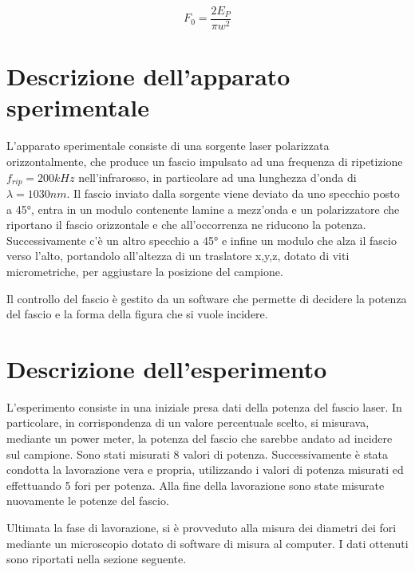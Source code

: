 \documentclass{article}
\begin{document}
\begin{equation}
    F_0 = \frac{2E_P}{\pi w^2}
    \label{fomula fluenza di picco}
\end{equation}



\section{Descrizione dell'apparato sperimentale}
L'apparato sperimentale consiste di una sorgente laser polarizzata orizzontalmente, che produce un fascio impulsato ad una frequenza di ripetizione $f_{rip} = 200 kHz$ nell'infrarosso, in particolare ad una lunghezza d'onda di $\lambda = 1030 nm$.
Il fascio inviato dalla sorgente viene deviato da uno specchio posto a 45°, entra in un modulo contenente lamine a mezz'onda e un polarizzatore che riportano il fascio orizzontale e che all'occorrenza ne riducono la potenza.
Successivamente c'è un altro specchio a 45° e infine un modulo che alza il fascio verso l'alto, portandolo all'altezza di un traslatore x,y,z, dotato di viti micrometriche, per aggiustare la posizione del campione.

Il controllo del fascio è gestito da un software che permette di decidere la potenza del fascio e la forma della figura che si vuole incidere.

\section{Descrizione dell'esperimento}
L'esperimento consiste in una iniziale presa dati della potenza del fascio laser.
In particolare, in corrispondenza di un valore percentuale scelto, si misurava, mediante un power meter, la potenza del fascio che sarebbe andato ad incidere sul campione. Sono stati misurati 8 valori di potenza.
Successivamente è stata condotta la lavorazione vera e propria, utilizzando i valori di potenza misurati ed effettuando 5 fori per potenza.
Alla fine della lavorazione sono state misurate nuovamente le potenze del fascio.

Ultimata la fase di lavorazione, si è provveduto alla misura dei diametri dei fori mediante un microscopio dotato di software di misura al computer.
I dati ottenuti sono riportati nella sezione seguente.
\end{document}
